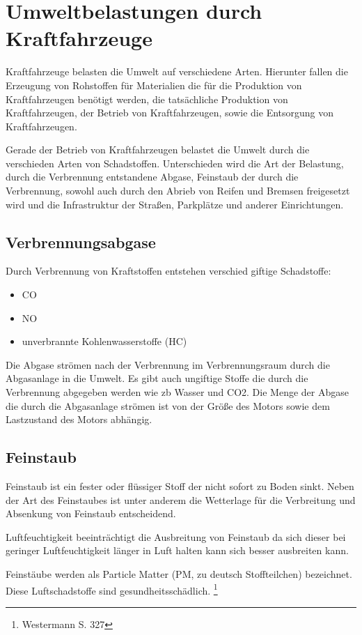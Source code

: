 \section{Umweltbelastungen durch Kraftfahrzeuge}
Kraftfahrzeuge belasten die Umwelt auf verschiedene Arten.
Hierunter fallen
die Erzeugung von Rohstoffen für Materialien die für die Produktion von Kraftfahrzeugen benötigt werden,
die tatsächliche Produktion von Kraftfahrzeugen,
der Betrieb von Kraftfahrzeugen,
sowie die Entsorgung von Kraftfahrzeugen.

Gerade der Betrieb von Kraftfahrzeugen belastet die Umwelt durch die verschieden Arten von Schadstoffen.
Unterschieden wird die Art der Belastung,
durch die Verbrennung entstandene Abgase,
Feinstaub der durch die Verbrennung, sowohl auch durch den Abrieb von Reifen und Bremsen freigesetzt wird
und die Infrastruktur der Straßen, Parkplätze und anderer Einrichtungen.

\subsection{Verbrennungsabgase}
Durch Verbrennung von Kraftstoffen entstehen verschied giftige Schadstoffe:
\begin{itemize}
	\item {\ac{CO}}
	\item {\ac{NO}}
	\item unverbrannte Kohlenwasserstoffe (HC)
\end{itemize}
Die Abgase strömen nach der Verbrennung im Verbrennungsraum durch die Abgasanlage in die Umwelt.
Es gibt auch ungiftige Stoffe die durch die Verbrennung abgegeben werden wie \ac{zb} \ac{Wasser} und \ac{CO2}.
Die Menge der Abgase die durch die Abgasanlage strömen ist von der Größe des Motors sowie dem Lastzustand des Motors abhängig.

\subsection{Feinstaub}
Feinstaub ist ein fester oder flüssiger Stoff der nicht sofort zu Boden sinkt.
Neben der Art des Feinstaubes ist unter anderem die Wetterlage für die Verbreitung und Absenkung von Feinstaub entscheidend.

Luftfeuchtigkeit beeinträchtigt die Ausbreitung von Feinstaub da sich dieser bei geringer Luftfeuchtigkeit länger in Luft halten kann sich besser ausbreiten kann.

Feinstäube werden als Particle Matter (PM, zu deutsch Stoffteilchen) bezeichnet. Diese Luftschadstoffe sind gesundheitsschädlich. \footnote{Westermann S. 327}

